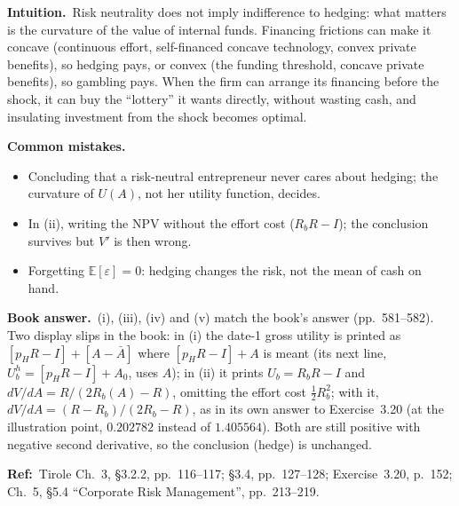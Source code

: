 \documentclass[11pt,a4paper]{article}
\newcommand{\intuition}{\par\medskip\noindent\textbf{Intuition.}~}
\newcommand{\bookans}{\par\medskip\noindent\textbf{Book answer.}~}
\newcommand{\refbib}{\par\smallskip\noindent\textbf{Ref:}~}
\newcommand{\pitfalls}{\par\medskip\noindent\textbf{Common mistakes.}}
\begin{document}
\intuition Risk neutrality does not imply indifference to hedging: what matters is the
curvature of the value of internal funds. Financing frictions can make it concave (continuous
effort, self-financed concave technology, convex private benefits), so hedging pays, or convex
(the funding threshold, concave private benefits), so gambling pays. When the firm can arrange
its financing before the shock, it can buy the ``lottery'' it wants directly, without wasting cash,
and insulating investment from the shock becomes optimal.
\pitfalls
\begin{itemize}
  \item Concluding that a risk-neutral entrepreneur never cares about hedging; the curvature of
        $U(A)$, not her utility function, decides.
  \item In (ii), writing the NPV without the effort cost ($R_bR-I$); the conclusion survives
        but $V'$ is then wrong.
  \item Forgetting $\mathbb{E}[\varepsilon]=0$: hedging changes the risk, not the mean of cash on hand.
\end{itemize}
\bookans (i), (iii), (iv) and (v) match the book's answer (pp.~581--582). Two display slips in the
book: in (i) the date-1 gross utility is printed as $[p_HR-I]+[A-\bar A]$ where $[p_HR-I]+A$ is
meant (its next line, $U_b^h=[p_HR-I]+A_0$, uses $A$); in (ii) it prints $U_b=R_bR-I$ and
$dV/dA=R/(2R_b(A)-R)$, omitting the effort cost $\tfrac12R_b^2$; with it,
$dV/dA=(R-R_b)/(2R_b-R)$, as in its own answer to Exercise~3.20 (at the illustration point,
$0.202782$ instead of $1.405564$). Both are still positive with negative second derivative, so
the conclusion (hedge) is unchanged.
\refbib{Tirole Ch.~3, \S3.2.2, pp.~116--117; \S3.4, pp.~127--128; Exercise~3.20, p.~152; Ch.~5, \S5.4 ``Corporate Risk Management'', pp.~213--219.}
\end{document}
